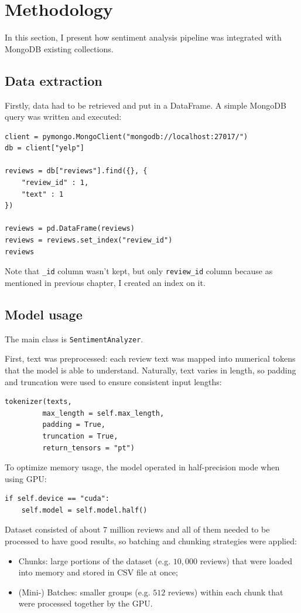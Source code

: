 \documentclass{Configuration_Files/PoliMi3i_thesis}
\begin{document}
\section{Methodology}
In this section, I present how sentiment analysis pipeline was integrated with MongoDB existing collections. 

\subsection{Data extraction}
Firstly, data had to be retrieved and put in a DataFrame. A simple MongoDB query was written and executed:

\bigskip

\begin{verbatim}
client = pymongo.MongoClient("mongodb://localhost:27017/")
db = client["yelp"]

reviews = db["reviews"].find({}, {
    "review_id" : 1,
    "text" : 1
})

reviews = pd.DataFrame(reviews)
reviews = reviews.set_index("review_id")
reviews
\end{verbatim}

\bigskip

Note that \texttt{\_id} column wasn't kept, but only \texttt{review\_id} column because as mentioned in previous chapter, I created an index on it.  

\subsection{Model usage}
The main class is \texttt{SentimentAnalyzer}.

First, text was preprocessed: each review text was mapped into numerical tokens that the model is able to understand. Naturally, text varies in length, so padding and truncation were used to ensure consistent input lengths:

\begin{verbatim}
tokenizer(texts, 
         max_length = self.max_length, 
         padding = True, 
         truncation = True, 
         return_tensors = "pt")
\end{verbatim}

To optimize memory usage, the model operated in half-precision mode when using GPU:
\begin{verbatim}
if self.device == "cuda":
    self.model = self.model.half()
\end{verbatim}

Dataset consisted of about $7$ million reviews and all of them needed to be processed to have good results, so batching and chunking strategies were applied:
\begin{itemize}
    \item Chunks: large portions of the dataset (e.g. $10,000$ reviews) that were loaded into memory and stored in CSV file at once;
    \item (Mini-) Batches: smaller groups (e.g. $512$ reviews) within each chunk that were processed together by the GPU.
\end{itemize}
\end{document}
